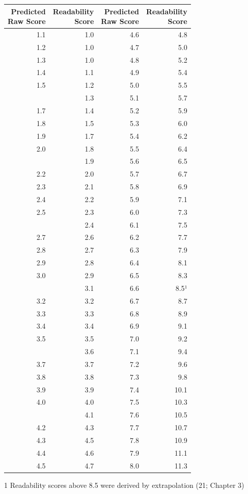 \documentclass[
]{book}
\theoremstyle{definition}
\theoremstyle{definition}
\theoremstyle{definition}
\theoremstyle{definition}
\theoremstyle{remark}
\begin{document}
\begin{table}
\centering
\begin{threeparttable}
\begin{tabular}[t]{r>{}r|rr}
\toprule
\makecell[c]{Predicted\\Raw Score} & \makecell[c]{Readability\\Score} & \makecell[c]{Predicted\\Raw Score } & \makecell[c]{Readability\\Score }\\
\midrule
1.1 & 1.0 & 4.6 & 4.8\\
1.2 & 1.0 & 4.7 & 5.0\\
1.3 & 1.0 & 4.8 & 5.2\\
1.4 & 1.1 & 4.9 & 5.4\\
1.5 & 1.2 & 5.0 & 5.5\\
\addlinespace
1.6 & 1.3 & 5.1 & 5.7\\
1.7 & 1.4 & 5.2 & 5.9\\
1.8 & 1.5 & 5.3 & 6.0\\
1.9 & 1.7 & 5.4 & 6.2\\
2.0 & 1.8 & 5.5 & 6.4\\
\addlinespace
2.1 & 1.9 & 5.6 & 6.5\\
2.2 & 2.0 & 5.7 & 6.7\\
2.3 & 2.1 & 5.8 & 6.9\\
2.4 & 2.2 & 5.9 & 7.1\\
2.5 & 2.3 & 6.0 & 7.3\\
\addlinespace
2.6 & 2.4 & 6.1 & 7.5\\
2.7 & 2.6 & 6.2 & 7.7\\
2.8 & 2.7 & 6.3 & 7.9\\
2.9 & 2.8 & 6.4 & 8.1\\
3.0 & 2.9 & 6.5 & 8.3\\
\addlinespace
3.1 & 3.1 & 6.6 & 8.5¹\\
3.2 & 3.2 & 6.7 & 8.7\\
3.3 & 3.3 & 6.8 & 8.9\\
3.4 & 3.4 & 6.9 & 9.1\\
3.5 & 3.5 & 7.0 & 9.2\\
\addlinespace
3.6 & 3.6 & 7.1 & 9.4\\
3.7 & 3.7 & 7.2 & 9.6\\
3.8 & 3.8 & 7.3 & 9.8\\
3.9 & 3.9 & 7.4 & 10.1\\
4.0 & 4.0 & 7.5 & 10.3\\
\addlinespace
4.1 & 4.1 & 7.6 & 10.5\\
4.2 & 4.3 & 7.7 & 10.7\\
4.3 & 4.5 & 7.8 & 10.9\\
4.4 & 4.6 & 7.9 & 11.1\\
4.5 & 4.7 & 8.0 & 11.3\\
\bottomrule
\end{tabular}
\begin{tablenotes}
\item[1] Readability scores above 8.5 were derived by extrapolation (21; Chapter 3)
\end{tablenotes}
\end{threeparttable}
\end{table}
\end{document}
